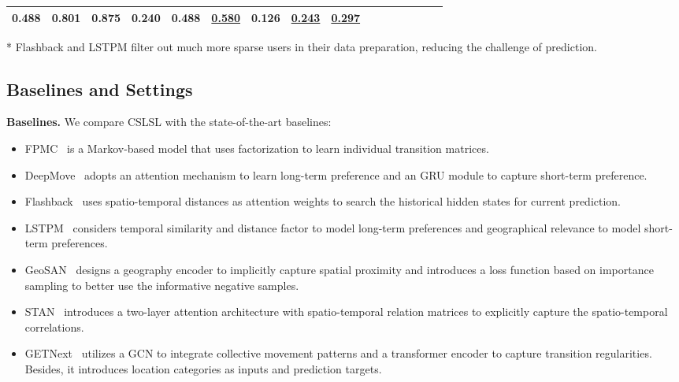 \documentclass[sigconf]{acmart}
\begin{document}
\begin{table}[hbt]
{\begin{threeparttable}
\begin{tabular}{ccccccc|cccccc|ccc}
                    \textbf{0.488} & \textbf{0.801} & \textbf{0.875} & \textbf{0.240} & \textbf{0.488} & \underline{0.580} & 
                    \textbf{0.126} & \underline{0.243} & \underline{0.297} \\
        \hline  
        \end{tabular}
        \begin{tablenotes}
        \footnotesize
        \item[*]Flashback and LSTPM filter out much more sparse users in their data preparation, reducing the challenge of prediction.  
        \end{tablenotes}
        \end{threeparttable}
    } 
\end{table}


\subsection{Baselines and Settings}

    \textbf{Baselines.} We compare CSLSL with the state-of-the-art baselines: 
    \begin{itemize}[leftmargin=*, topsep=2pt]
        \item FPMC~\cite{rendle2010factorizing} is a Markov-based model that uses factorization to learn individual transition matrices.
        \item DeepMove~\cite{feng2018deepmove} adopts an attention mechanism to learn long-term preference and an GRU module to capture short-term preference. 
        \item Flashback~\cite{yang2020location} uses spatio-temporal distances as attention weights to search the historical hidden states for current prediction.
        \item LSTPM~\cite{sun2020go} considers temporal similarity and distance factor to model long-term preferences and geographical relevance to model short-term preferences. 
        \item GeoSAN~\cite{lian2020geography} designs a geography encoder to implicitly capture spatial proximity and introduces a loss function based on importance sampling to better use the informative negative samples. 
        \item STAN~\cite{luo2021stan} introduces a two-layer attention architecture with spatio-temporal relation matrices to explicitly capture the spatio-temporal correlations. 
        \item GETNext~\cite{yang2022getnext} utilizes a GCN to integrate collective movement patterns and a transformer encoder to capture transition regularities. Besides, it introduces location categories as inputs and prediction targets.
    \end{itemize}
    
\end{document}
